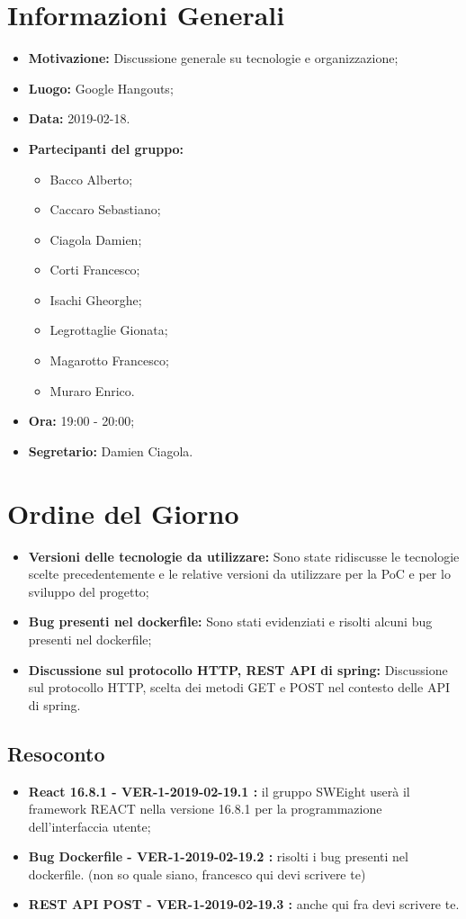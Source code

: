 \documentclass[a4paper, oneside, openany, dvipsnames, table]{article}
\begin{document}
\copertina{}


\newpage
\tableofcontents
\newpage
\section{Informazioni Generali}
\begin{itemize}
\item \textbf{Motivazione:} Discussione generale su tecnologie e organizzazione;
\item \textbf{Luogo:} Google Hangouts;
\item \textbf{Data:} 2019-02-18.
\item \textbf{Partecipanti del gruppo:} \hfill
	\begin{itemize}
	\item Bacco Alberto;
	\item Caccaro Sebastiano;
	\item Ciagola Damien;
	\item Corti Francesco;
	\item Isachi Gheorghe;
	\item Legrottaglie Gionata;
	\item Magarotto Francesco;
	\item Muraro Enrico.
	\end{itemize} 
\item \textbf{Ora:} 19:00 - 20:00;
\item \textbf{Segretario:} Damien Ciagola.
\end{itemize}

\section{Ordine del Giorno}
\begin{itemize}
\item \textbf{Versioni delle tecnologie da utilizzare:} Sono state ridiscusse le tecnologie scelte precedentemente e le relative versioni da utilizzare per la PoC e per lo sviluppo del progetto;
\item \textbf{Bug presenti nel dockerfile:} Sono stati evidenziati e risolti alcuni bug presenti nel dockerfile;
\item \textbf{Discussione sul protocollo HTTP, REST API di spring:}
Discussione sul protocollo HTTP, scelta dei metodi GET e POST nel contesto delle API di spring.
\end{itemize}

\subsection{Resoconto}
\begin{itemize}
\item \textbf{React 16.8.1 - VER-1-2019-02-19.1 :}  il gruppo SWEight userà il framework REACT nella versione 16.8.1 per la programmazione dell’interfaccia utente;
\item \textbf{Bug Dockerfile - VER-1-2019-02-19.2 :} risolti i bug presenti nel dockerfile. (non so quale siano, francesco qui devi scrivere te)
\item \textbf{REST API POST - VER-1-2019-02-19.3 :} anche qui fra devi scrivere te.
\end{itemize}
\end{document}
